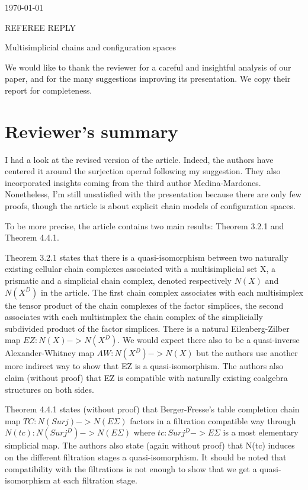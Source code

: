 \documentclass{amsart}
\begin{document}
	\noindent\today
	\begin{center}
		\vspace*{10pt}
		{\Large REFEREE REPLY}\par
		\vspace*{5pt}
		{\large Multisimplicial chains and configuration spaces}
		\vspace*{20pt}
	\end{center}

	We would like to thank the reviewer for a careful and insightful analysis of our paper, and for the many suggestions improving its presentation.
	We copy their report for completeness.

	\section{Reviewer's summary}

	I had a look at the revised version of the article.
	Indeed, the authors have centered it around the surjection operad following my suggestion.
	They also incorporated insights coming from the third author Medina-Mardones.
	Nonetheless, I'm still unsatisfied with the presentation because there are only few proofs, though the article is about explicit chain models of configuration spaces.

	To be more precise, the article contains two main results: Theorem 3.2.1 and Theorem 4.4.1.

	Theorem 3.2.1 states that there is a quasi-isomorphism between two naturally existing cellular chain complexes associated with a multisimplicial set X, a prismatic and a simplicial chain complex, denoted respectively $N(X)$ and $N(X^D)$ in the article.
	The first chain complex associates with each multisimplex the tensor product of the chain complexes of the factor simplices, the second associates with each multisimplex the chain complex of the simplicially subdivided product of the factor simplices.
	There is a natural Eilenberg-Zilber map $EZ:N(X)->N(X^D)$.
	We would expect there also to be a quasi-inverse Alexander-Whitney map $AW:N(X^D)->N(X)$ but the authors use another more indirect way to show that EZ is a quasi-isomorphism.
	The authors also claim (without proof) that EZ is compatible with naturally existing coalgebra structures on both sides.

	Theorem 4.4.1 states (without proof) that Berger-Fresse's table completion chain map $TC:N(Surj)->N(E\Sigma)$ factors in a filtration compatible way through $N(tc):N(Surj^D)->N(E\Sigma)$ where $tc:Surj^D->E\Sigma$ is a most elementary simplicial map.
	The authors also state (again without proof) that N(tc) induces on the different filtration stages a quasi-isomorphism.
	It should be noted that compatibility with the filtrations is not enough to show that we get a quasi-isomorphism at each filtration stage.
\end{document}

